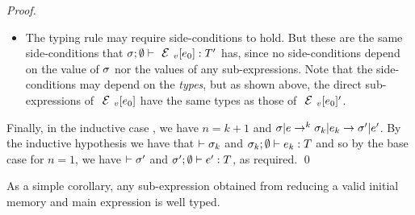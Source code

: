 \begin{proof}
{\begin{itemize}
	\item The typing rule may require side-conditions to hold. But these are the same side-conditions that $\tyr{\EV[e_0]}{T'}$ has, since no side-conditions depend on the value of $\sigma$ nor the values of any sub-expressions. Note that the side-conditions may depend on the \emph{types}, but as shown above, the direct sub-expressions of $\EV[e_0]$ have the same types as those of $\EV[e_0]'$.
	\end{itemize}}
%

	\noindent Finally, in the inductive case , we have $n = k+1$ and $\sigma|e\rightarrow^{k}\sigma_k|e_k\rightarrow\sigma'|e'$.
	By the inductive hypothesis we have that $\vdash\sigma_k$ and $\tyr[\s_k]{e_k}T$
	and so by the base case for $n = 1$, we have $\vdash\sigma'$ and $\tyr[\s']{e'}T$,
	as required.
	\qed\end{proof}

\LS

As a simple corollary, any sub-expression obtained from reducing a valid initial memory and main expression is well typed.

